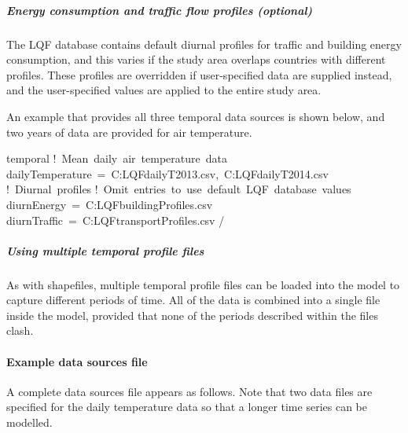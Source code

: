 \documentclass[letterpaper,10pt,english]{sphinxmanual}
\begin{document}
\subparagraph{Energy consumption and traffic flow profiles (optional)}
\label{\detokenize{OtherManuals/LQF_Manual:energy-consumption-and-traffic-flow-profiles-optional}}
The LQF database contains default diurnal profiles for traffic and
building energy consumption, and this varies if the study area overlaps
countries with different profiles. These profiles are overridden if
user-specified data are supplied instead, and the user-specified values
are applied to the entire study area.

An example that provides all three temporal data sources is shown below,
and two years of data are provided for air temperature.

%
\begin{sphinxVerbatim}[commandchars=\\\{\}]
\PYGZam{}temporal
   ! Mean daily air temperature data
   dailyTemperature = \PYGZsq{}C:\PYGZbs{}LQF\PYGZbs{}dailyT\PYGZus{}2013.csv\PYGZsq{}, \PYGZsq{}C:\PYGZbs{}LQF\PYGZbs{}dailyT\PYGZus{}2014.csv\PYGZsq{}
   ! Diurnal profiles
   ! Omit entries to use default LQF database values
   diurnEnergy = \PYGZsq{}C:\PYGZbs{}LQF\PYGZbs{}buildingProfiles.csv\PYGZsq{}
   diurnTraffic = \PYGZsq{}C:\PYGZbs{}LQF\PYGZbs{}transportProfiles.csv\PYGZsq{}
/
\end{sphinxVerbatim}


\subparagraph{Using multiple temporal profile files}
\label{\detokenize{OtherManuals/LQF_Manual:using-multiple-temporal-profile-files}}
As with shapefiles, multiple temporal profile files can be loaded into
the model to capture different periods of time. All of the data is
combined into a single file inside the model, provided that none of the
periods described within the files clash.


\paragraph{Example data sources file}
\label{\detokenize{OtherManuals/LQF_Manual:example-data-sources-file}}
A complete data sources file appears as follows. Note that two data
files are specified for the daily temperature data so that a longer time
series can be modelled.
\end{document}

